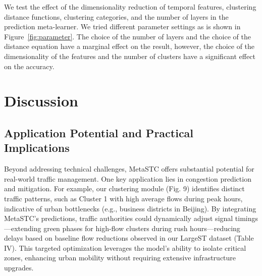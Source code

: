 \documentclass[lettersize,journal]{IEEEtran}
\begin{document}
We test the effect of the dimensionality reduction of temporal features, clustering distance functions, clustering categories, and the number of layers in the prediction meta-learner. We tried different parameter settings as is shown in Figure~\ref{fig:parameter}. The choice of the number of layers and the choice of the distance equation have a marginal effect on the result, however, the choice of the dimensionality of the features and the number of clusters have a significant effect on the accuracy.

\section{Discussion}
\subsection{Application Potential and Practical Implications}

Beyond addressing technical challenges, MetaSTC offers substantial potential for real-world traffic management. One key application lies in congestion prediction and mitigation. For example, our clustering module (Fig. 9) identifies distinct traffic patterns, such as Cluster 1 with high average flows during peak hours, indicative of urban bottlenecks (e.g., business districts in Beijing). By integrating MetaSTC’s predictions, traffic authorities could dynamically adjust signal timings—extending green phases for high-flow clusters during rush hours—reducing delays based on baseline flow reductions observed in our LargeST dataset (Table IV). This targeted optimization leverages the model’s ability to isolate critical zones, enhancing urban mobility without requiring extensive infrastructure upgrades. 

\end{document}
